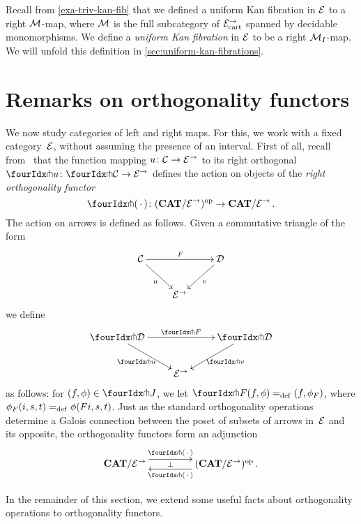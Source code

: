 \documentclass[reqno,10pt,a4paper,oneside]{amsart}
\begin{document}
\begin{example} Recall from \cref{exa-triv-kan-fib} that we defined a uniform Kan fibration in
$\cal{E}$ to a right $\cal{M}$-map, where $\cal{M}$ is the full subcategory of $\cal{E}^\to_\cart$
spanned by decidable monomorphisms. We define a \emph{uniform Kan fibration} in $\cal{E}$
to be a right $\cal{M}_{I}$-map. We will unfold this definition in \cref{sec:uniform-kan-fibrations}.  
 \end{example} 
  


\section{Remarks on orthogonality functors} 
\label{sec-orthog-functors}

We now study categories of left and right maps. For this, we work with a fixed category~$\catE$, without assuming the presence of an interval. First of all, recall from~\cite{garner:small-object-argument} that the function mapping $u \co \cal{C} \to \catE^\to$ to its right orthogonal $\liftr{u} \co \liftr{\cal{C}} \to \cal{E}^\to$ defines the action on objects of the \emph{right orthogonality functor}
\[
\liftr{\brarghole} \co  (\CAT/\catE^{\to})^{\op} \to \CAT/\catE^{\to} \, .
\]
The action  on arrows is defined as follows. Given a commutative triangle of the form
\[
\xymatrix{
\cal{C} \ar[dr]_u \ar[rr]^F & & \cal{D} \ar[dl]^{v} \\
 & \catE^\to }
 \]
we define 
\[
\xymatrix{
\liftr{\cal{D}} \ar[dr]_{\liftr{u}} \ar[rr]^{\liftr{F}} & & \liftr{\cal{D}} \ar[dl]^{\liftr{v}} \\
 & \catE^\to }
\]
as follows: for $(f, \phi) \in \liftr{J}$, we let $\liftr{F}(f,\phi) \defeq (f, \phi_F)$, where $\phi_F(i, s, t) \defeq \phi(Fi, s, t)$. 
Just as the standard orthogonality operations determine a Galois connection between the poset of subsets of arrows in~$\catE$ and its opposite, the orthogonality functors form an adjunction 
\begin{equation}
\label{garner-adjunction}
\begin{gathered}
\xymatrix@C+2em{
  \CAT/\catE^{\to}
  \ar@<5pt>[r]^-{\liftl{\brarghole}}
  \ar@{}[r]|-{\bot}
&
  (\CAT/\catE^{\to})^{\op} \, .
  \ar@<5pt>[l]^-{\liftr{\brarghole}}
}
\end{gathered}
\end{equation}





In the remainder of this section, we extend some useful facts about orthogonality operations to orthogonality functors.
\end{document}
